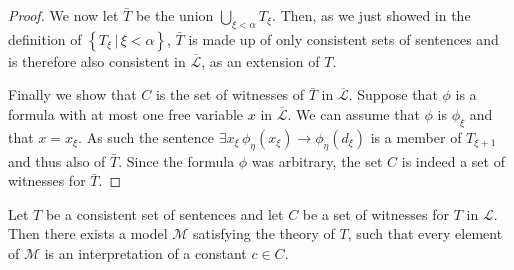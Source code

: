 \documentclass[../../main.tex]{subfiles}
\begin{document}
\begin{proof}
    We now let $\bar{T}$ be the union $\bigcup_{\xi < \alpha} T_\xi$.
    Then, as we just showed in the definition of $\left\{T_\xi \, \vert \, \xi < \alpha\right\}$,
    $\bar{T}$ is made up of only consistent sets of sentences and is therefore also consistent in $\overline{\mathcal{L}}$,
    as an extension of $T$.

    Finally we show that $C$ is the set of witnesses of $\bar{T}$ in $\overline{\mathcal{L}}$.
    Suppose that $\phi$ is a formula with at most one free variable $x$ in $\overline{\mathcal{L}}$.
    We can assume that $\phi$ is $\phi_\xi$ and that $x = x_\xi$.
    As such the sentence $\exists x_\xi \, \phi_\eta(x_\xi) \rightarrow \phi_\eta(d_\xi)$ is a member of $T_{\xi + 1}$ and thus also of $\bar{T}$.
    Since the formula $\phi$ was arbitrary, the set $C$ is indeed a set of witnesses for $\bar{T}$. 
\end{proof}

\begin{lemma}\cite[Lemma 2.1.2]{Cha90}
    Let $T$ be a consistent set of sentences and let $C$ be a set of witnesses for $T$ in $\mathcal{L}$.
    Then there exists a model $\mathcal{M}$ satisfying the theory of $T$, such that every element of $\mathcal{M}$ is an interpretation of a constant $c \in C$.
\end{lemma} 
\end{document}
